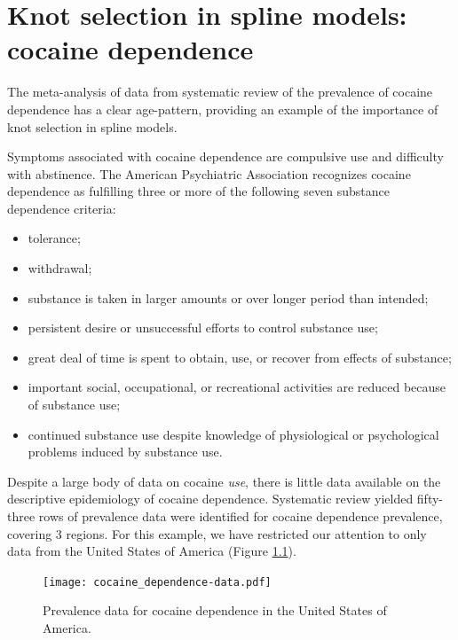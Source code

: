 \chapter{Knot selection in spline models: cocaine dependence}
\label{applications-splines_knot_loc}

The meta-analysis of data from systematic review of the prevalence of
cocaine dependence has a clear age-pattern, providing an example of
the importance of knot selection in spline models.

Symptoms associated with cocaine dependence are compulsive use and
difficulty with abstinence.  The American Psychiatric Association
recognizes cocaine dependence as fulfilling three or more of the
following seven substance dependence criteria: \cite{american_diagnostic_2000, miller_cocaine_1989}
    \begin{itemize} \label{page:app-substance_dependence}
        \item tolerance;
        \item withdrawal;
        \item substance is taken in larger amounts or over longer
          period than intended;
        \item persistent desire or unsuccessful efforts to control
          substance use;
        \item great deal of time is spent to obtain, use, or recover
          from effects of substance;
        \item important social, occupational, or recreational
          activities are reduced because of substance use;
        \item continued substance use despite knowledge of
          physiological or psychological problems induced by substance
          use.
    \end{itemize}

Despite a large body of data on cocaine \emph{use}, there is little
data available on the descriptive epidemiology of cocaine
dependence.\cite{Degenhardt_GBDrugs_2011} Systematic review yielded
fifty-three rows of prevalence data were identified for cocaine
dependence prevalence, covering 3 regions.  For this example, we have
restricted our attention to only data from the United States of America (Figure
\ref{fig:app-cocaine_data}).

    \begin{figure}[h]
        \begin{center}
            \texttt{[image: cocaine\_dependence-data.pdf]}
            \caption{Prevalence data for cocaine dependence in the United States of America.}
            \label{fig:app-cocaine_data}
        \end{center}
    \end{figure}

